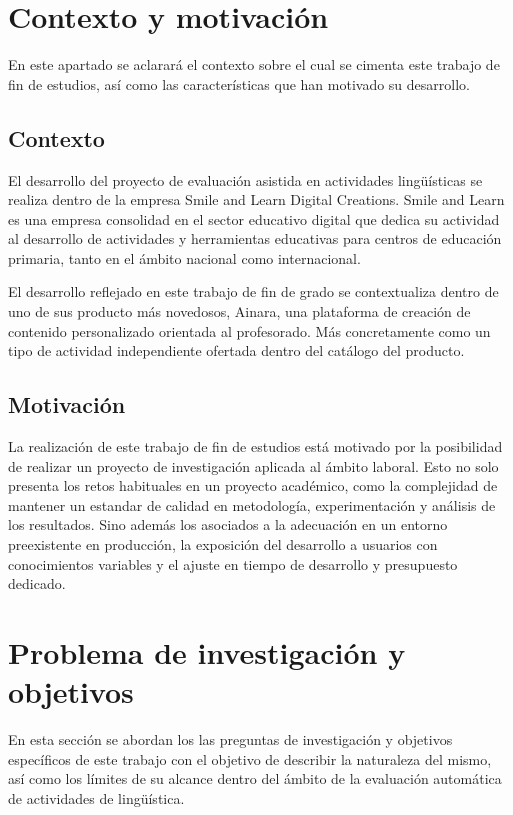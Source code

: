 \section{Contexto y motivación}
En este apartado se aclarará el contexto sobre el cual se cimenta este trabajo de fin de estudios, así como las características que han motivado su desarrollo.
\subsection{Contexto}
El desarrollo del proyecto de evaluación asistida en actividades lingüísticas se realiza dentro de la empresa Smile and Learn Digital Creations. Smile and Learn es una empresa consolidad en el sector educativo digital que dedica su actividad al desarrollo de actividades y herramientas educativas para centros de educación primaria, tanto en el ámbito nacional como internacional.

El desarrollo reflejado en este trabajo de fin de grado se contextualiza dentro de uno de sus producto más novedosos, Ainara, una plataforma de creación de contenido personalizado orientada al profesorado. Más concretamente como un tipo de actividad independiente ofertada dentro del catálogo del producto.

\subsection{Motivación}
La realización de este trabajo de fin de estudios está motivado por la posibilidad de realizar un proyecto de investigación aplicada al ámbito laboral. Esto no solo presenta los retos habituales en un proyecto académico, como la complejidad de mantener un estandar de calidad en metodología, experimentación y análisis de los resultados. Sino además los asociados a la adecuación en un entorno preexistente en producción, la exposición del desarrollo a usuarios con conocimientos variables y el ajuste en tiempo de desarrollo y presupuesto dedicado.

\section{Problema de investigación y objetivos}
En esta sección se abordan los las preguntas de investigación y objetivos específicos de este trabajo con el objetivo de describir la naturaleza del mismo, así como los límites de su alcance dentro del ámbito de la evaluación automática de actividades de lingüística.

